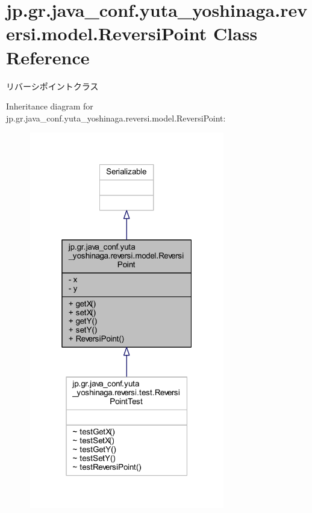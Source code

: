 \hypertarget{classjp_1_1gr_1_1java__conf_1_1yuta__yoshinaga_1_1reversi_1_1model_1_1_reversi_point}{}\section{jp.\+gr.\+java\+\_\+conf.\+yuta\+\_\+yoshinaga.\+reversi.\+model.\+Reversi\+Point Class Reference}
\label{classjp_1_1gr_1_1java__conf_1_1yuta__yoshinaga_1_1reversi_1_1model_1_1_reversi_point}


リバーシポイントクラス  




Inheritance diagram for jp.\+gr.\+java\+\_\+conf.\+yuta\+\_\+yoshinaga.\+reversi.\+model.\+Reversi\+Point\+:\nopagebreak
\begin{figure}[H]
\begin{center}
\leavevmode
\includegraphics[width=241pt]{classjp_1_1gr_1_1java__conf_1_1yuta__yoshinaga_1_1reversi_1_1model_1_1_reversi_point__inherit__graph}
\end{center}
\end{figure}


